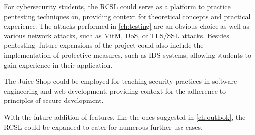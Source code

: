 For cybersecurity students, the RCSL could serve as a platform to practice pentesting techniques on, providing context for theoretical concepts and practical experience.
The attacks performed in \cref{ch:testing} are an obvious choice as well as various network attacks, such as MitM, DoS, or TLS/SSL attacks.
Besides pentesting, future expansions of the project could also include the implementation of protective measures, such as IDS systems, allowing students to gain experience in their application.

The Juice Shop could be employed for teaching security practices in software engineering and web development, providing context for the adherence to principles of secure development.

With the future addition of features, like the ones suggested in \cref{ch:outlook}, the RCSL could be expanded to cater for numerous further use cases.